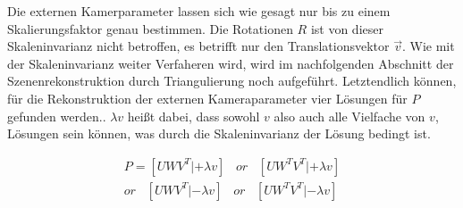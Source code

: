  Die externen Kamerparameter lassen sich wie gesagt nur bis zu einem Skalierungsfaktor genau bestimmen. Die Rotationen $R$ ist von dieser Skaleninvarianz nicht betroffen, es betrifft nur den Translationsvektor $\vec{v}$. Wie mit der Skaleninvarianz weiter Verfaheren wird, wird im nachfolgenden Abschnitt der Szenenrekonstruktion durch Triangulierung noch aufgeführt. Letztendlich können, für die Rekonstruktion der externen Kameraparameter vier Lösungen für $P$ gefunden werden.\cite{HZ,Ferid}. $\lambda v$ heißt dabei, dass sowohl $v$ also auch alle Vielfache von $v$, Lösungen sein können, was durch die Skaleninvarianz der Lösung bedingt ist\cite{HZ,Ferid}. 

\begin{gather}
P = [UWV^T|+\lambda v] \;\;\; or \;\;\;[UW^TV^T|+\lambda v]\\
or\;\;\; [UWV^T|-\lambda v] \;\;\; or \;\;\;[UW^TV^T|-\lambda v]
\end{gather}

